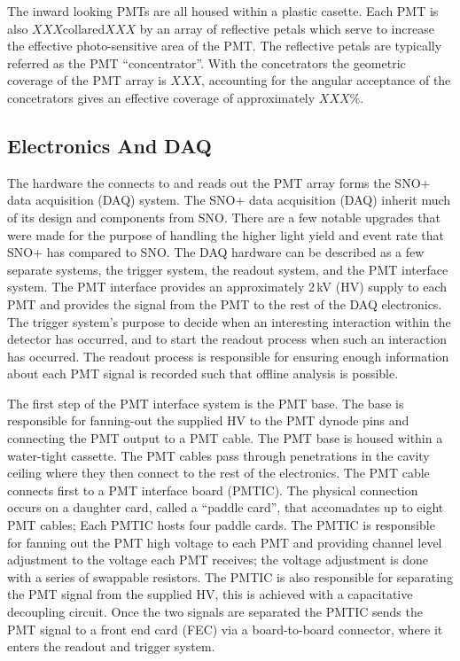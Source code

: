 The inward looking PMTs are all housed within a plastic casette.
Each PMT is also $XXX$collared$XXX$ by an array of reflective
petals which serve to increase the effective photo-sensitive area
of the PMT.
The reflective petals are typically referred as the PMT ``concentrator''.
With the concetrators the geometric coverage of the PMT array is $XXX$,
accounting for the angular acceptance of the concetrators gives
an effective coverage of approximately $XXX\%$.


\subsection{Electronics And DAQ}
The hardware the connects to and reads out the PMT array forms the SNO+ data acquisition (DAQ)
system\@.
The SNO+ data acquisition (DAQ) inherit much of its design and components from
SNO\@.
There are a few notable upgrades that were made for the purpose of handling the
higher light yield and event rate that SNO+ has compared to SNO\@.
The DAQ hardware can be described as a few separate systems, the trigger system,
the readout system, and the PMT interface system.
The PMT interface provides an approximately 2\,kV (HV) supply to each PMT and provides
the signal from the PMT to the rest of the DAQ electronics.
The trigger system's purpose to decide when an interesting interaction
within the detector has occurred, and to start the readout process when such an
interaction has occurred.
The readout process is responsible for ensuring enough information about each
PMT signal is recorded such that offline analysis is possible.

The first step of the PMT interface system is the PMT base. The base is responsible
for fanning-out the supplied HV to the PMT dynode pins and connecting the PMT output
to a PMT cable. The PMT base is housed within a water-tight cassette.
The PMT cables pass through penetrations in the cavity ceiling where they then connect
to the rest of the electronics. The PMT cable connects first to a PMT interface
board (PMTIC). The physical connection occurs on a daughter card, called a ``paddle card'',
that accomadates up to eight PMT cables; Each PMTIC hosts four paddle cards.
The PMTIC is responsible for fanning out the PMT high voltage
to each PMT and providing channel level adjustment to the voltage
each PMT receives; the voltage adjustment is done with a series of
swappable resistors.
The PMTIC is also responsible for separating the PMT signal from the supplied
HV, this is achieved with a capacitative decoupling circuit.
Once the two signals are separated the PMTIC sends the PMT signal to
a front end card (FEC) via a board-to-board connector, where it enters
the readout and trigger system.

